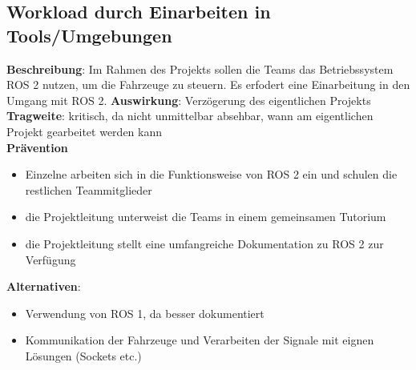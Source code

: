 \documentclass[a4paper, 12pt, titlepage]{scrartcl}
\begin{document}
	\subsection{Workload durch Einarbeiten in Tools/Umgebungen}
		\textbf{Beschreibung}: Im Rahmen des Projekts sollen die Teams das Betriebssystem ROS 2 nutzen, um die Fahrzeuge zu steuern. Es erfodert eine Einarbeitung in den Umgang mit ROS 2.
		\textbf{Auswirkung}: Verz\"ogerung des eigentlichen Projekts\\
		\textbf{Tragweite}: kritisch, da nicht unmittelbar absehbar, wann am eigentlichen Projekt gearbeitet werden kann\\
		\textbf{Pr\"avention}
			\begin{itemize}
				\item Einzelne arbeiten sich in die Funktionsweise von ROS 2 ein und schulen die restlichen Teammitglieder
				\item die Projektleitung unterweist die Teams in einem gemeinsamen Tutorium
				\item die Projektleitung stellt eine umfangreiche Dokumentation zu ROS 2 zur Verf\"ugung
		\end{itemize}
		\textbf{Alternativen}:
			\begin{itemize}
				\item Verwendung von ROS 1, da besser dokumentiert
				\item Kommunikation der Fahrzeuge und Verarbeiten der Signale mit eignen L\"osungen (Sockets etc.)
			\end{itemize}
		
\end{document}
